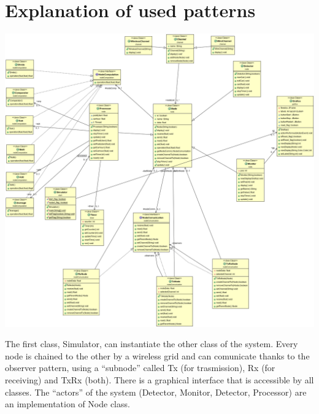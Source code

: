 \documentclass[a4paper,titlepage]{article}
\begin{document}
\newpage
\section{Explanation of used patterns}

    \begin{center}

    \centering
    \includegraphics[scale=0.30]{ClassDiagram.png}

    \end{center}


The first class, Simulator, can instantiate the other class of the system. Every node is chained to the other by a wireless grid and can comunicate thanks to the observer pattern, using a ``subnode'' called Tx (for trasmission), Rx (for receiving) and TxRx (both). There is a graphical interface that is accessible by all classes. The ``actors'' of the system (Detector, Monitor, Detector, Processor) are an implementation of Node class.
\end{document}
